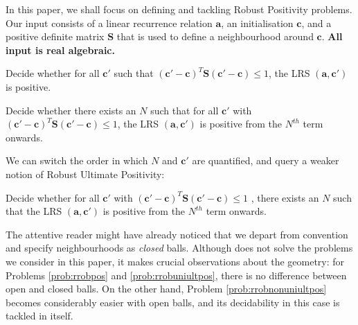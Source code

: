 In this paper, we shall focus on defining and tackling Robust Positivity problems. Our input consists of a linear recurrence relation $\mathbf{a}$, an initialisation $\mathbf{c}$, and a positive definite matrix $\mathbf{S}$ that is used to define a neighbourhood around $\mathbf{c}$. \textbf{All input is real algebraic.}\footnotemark {}

\begin{problem}
\label{prob:rrobpos}
Decide whether for all $\mathbf{c'}$ such that $(\mathbf{c'} - \mathbf{c})^T\mathbf{S}(\mathbf{c'} - \mathbf{c}) \le 1$, the LRS $(\mathbf{a}, \mathbf{c'})$ is positive.
\end{problem}

\begin{problem}
\label{prob:rrobuniultpos}
Decide whether there exists an $N$ such that for all $\mathbf{c'}$ with $(\mathbf{c'} - \mathbf{c})^T\mathbf{S}(\mathbf{c'} - \mathbf{c}) \le 1$, the LRS $(\mathbf{a}, \mathbf{c'})$ is positive from the $N^{th}$ term onwards.
\end{problem}

We can switch the order in which $N$ and $\mathbf{c'}$ are quantified, and query a weaker notion of Robust Ultimate Positivity:
\begin{problem}
\label{prob:rrobnonuniultpos}
Decide whether for all $\mathbf{c'}$ with $(\mathbf{c'} - \mathbf{c})^T\mathbf{S}(\mathbf{c'} - \mathbf{c}) \le 1$ , there exists an $N$ such that the LRS $(\mathbf{a}, \mathbf{c'})$ is positive from the $N^{th}$ term onwards.
\end{problem}

The attentive reader might have already noticed that we depart from convention and specify neighbourhoods as \textit{closed} balls. Although \cite{originalarxiv} does not solve the problems we consider in this paper, it makes crucial observations about the geometry: for Problems \ref{prob:rrobpos} and \ref{prob:rrobuniultpos}, there is no difference between open and closed balls. On the other hand, Problem \ref{prob:rrobnonuniultpos} becomes considerably easier with open balls, and its decidability in this case is tackled in \cite{originalarxiv} itself. 

